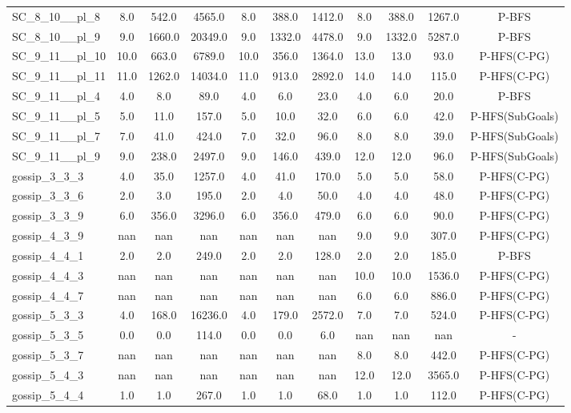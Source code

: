 \begin{table}[!ht]
\begin{tabular}{l|ccc|ccc|cccc}
SC\_8\_10\_\_pl\_8 & 8.0 & 542.0 & 4565.0 & 8.0 & 388.0 & 1412.0 & 8.0 & 388.0 & 1267.0 & P-BFS \\
SC\_8\_10\_\_pl\_9 & 9.0 & 1660.0 & 20349.0 & 9.0 & 1332.0 & 4478.0 & 9.0 & 1332.0 & 5287.0 & P-BFS \\
SC\_9\_11\_\_pl\_10 & 10.0 & 663.0 & 6789.0 & 10.0 & 356.0 & 1364.0 & 13.0 & 13.0 & 93.0 & P-HFS(C-PG) \\
SC\_9\_11\_\_pl\_11 & 11.0 & 1262.0 & 14034.0 & 11.0 & 913.0 & 2892.0 & 14.0 & 14.0 & 115.0 & P-HFS(C-PG) \\
SC\_9\_11\_\_pl\_4 & 4.0 & 8.0 & 89.0 & 4.0 & 6.0 & 23.0 & 4.0 & 6.0 & 20.0 & P-BFS \\
SC\_9\_11\_\_pl\_5 & 5.0 & 11.0 & 157.0 & 5.0 & 10.0 & 32.0 & 6.0 & 6.0 & 42.0 & P-HFS(SubGoals) \\
SC\_9\_11\_\_pl\_7 & 7.0 & 41.0 & 424.0 & 7.0 & 32.0 & 96.0 & 8.0 & 8.0 & 39.0 & P-HFS(SubGoals) \\
SC\_9\_11\_\_pl\_9 & 9.0 & 238.0 & 2497.0 & 9.0 & 146.0 & 439.0 & 12.0 & 12.0 & 96.0 & P-HFS(SubGoals) \\
gossip\_3\_3\_3 & 4.0 & 35.0 & 1257.0 & 4.0 & 41.0 & 170.0 & 5.0 & 5.0 & 58.0 & P-HFS(C-PG) \\
gossip\_3\_3\_6 & 2.0 & 3.0 & 195.0 & 2.0 & 4.0 & 50.0 & 4.0 & 4.0 & 48.0 & P-HFS(C-PG) \\
gossip\_3\_3\_9 & 6.0 & 356.0 & 3296.0 & 6.0 & 356.0 & 479.0 & 6.0 & 6.0 & 90.0 & P-HFS(C-PG) \\
gossip\_4\_3\_9 & nan & nan & nan & nan & nan & nan & 9.0 & 9.0 & 307.0 & P-HFS(C-PG) \\
gossip\_4\_4\_1 & 2.0 & 2.0 & 249.0 & 2.0 & 2.0 & 128.0 & 2.0 & 2.0 & 185.0 & P-BFS \\
gossip\_4\_4\_3 & nan & nan & nan & nan & nan & nan & 10.0 & 10.0 & 1536.0 & P-HFS(C-PG) \\
gossip\_4\_4\_7 & nan & nan & nan & nan & nan & nan & 6.0 & 6.0 & 886.0 & P-HFS(C-PG) \\
gossip\_5\_3\_3 & 4.0 & 168.0 & 16236.0 & 4.0 & 179.0 & 2572.0 & 7.0 & 7.0 & 524.0 & P-HFS(C-PG) \\
gossip\_5\_3\_5 & 0.0 & 0.0 & 114.0 & 0.0 & 0.0 & 6.0 & nan & nan & nan & - \\
gossip\_5\_3\_7 & nan & nan & nan & nan & nan & nan & 8.0 & 8.0 & 442.0 & P-HFS(C-PG) \\
gossip\_5\_4\_3 & nan & nan & nan & nan & nan & nan & 12.0 & 12.0 & 3565.0 & P-HFS(C-PG) \\
gossip\_5\_4\_4 & 1.0 & 1.0 & 267.0 & 1.0 & 1.0 & 68.0 & 1.0 & 1.0 & 112.0 & P-HFS(C-PG) \\

\end{tabular}
\end{table}
